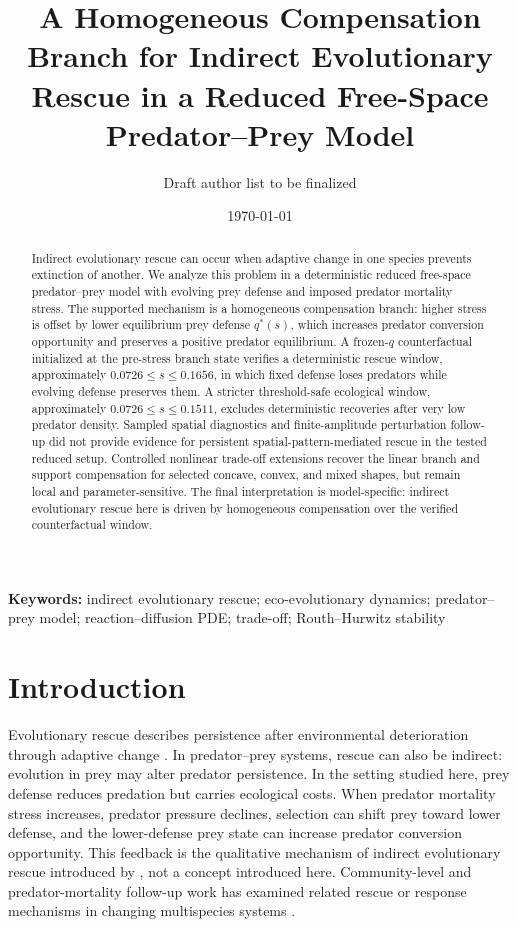 \documentclass[11pt]{article}
\title{A Homogeneous Compensation Branch for Indirect Evolutionary Rescue in a Reduced Free-Space Predator--Prey Model}
\author{Draft author list to be finalized}
\date{\today}
\begin{document}
\maketitle

\begin{abstract}
Indirect evolutionary rescue can occur when adaptive change in one species prevents extinction of another. We analyze this problem in a deterministic reduced free-space predator--prey model with evolving prey defense and imposed predator mortality stress. The supported mechanism is a homogeneous compensation branch: higher stress is offset by lower equilibrium prey defense \(q^*(s)\), which increases predator conversion opportunity and preserves a positive predator equilibrium. A frozen-\(q\) counterfactual initialized at the pre-stress branch state verifies a deterministic rescue window, approximately \(0.0726\le s\le0.1656\), in which fixed defense loses predators while evolving defense preserves them. A stricter threshold-safe ecological window, approximately \(0.0726\le s\le0.1511\), excludes deterministic recoveries after very low predator density. Sampled spatial diagnostics and finite-amplitude perturbation follow-up did not provide evidence for persistent spatial-pattern-mediated rescue in the tested reduced setup. Controlled nonlinear trade-off extensions recover the linear branch and support compensation for selected concave, convex, and mixed shapes, but remain local and parameter-sensitive. The final interpretation is model-specific: indirect evolutionary rescue here is driven by homogeneous compensation over the verified counterfactual window.
\end{abstract}

\begin{center}
\small\textbf{Keywords:} indirect evolutionary rescue; eco-evolutionary dynamics; predator--prey model; reaction--diffusion PDE; trade-off; Routh--Hurwitz stability
\end{center}

\section{Introduction}

Evolutionary rescue describes persistence after environmental deterioration through adaptive change \citep{GomulkiewiczHolt1995,BellGonzalez2009,Bell2017}. In predator--prey systems, rescue can also be indirect: evolution in prey may alter predator persistence. In the setting studied here, prey defense reduces predation but carries ecological costs. When predator mortality stress increases, predator pressure declines, selection can shift prey toward lower defense, and the lower-defense prey state can increase predator conversion opportunity. This feedback is the qualitative mechanism of indirect evolutionary rescue introduced by \citet{YamamichiMiner2015}, not a concept introduced here. Community-level and predator-mortality follow-up work has examined related rescue or response mechanisms in changing multispecies systems \citep{FussmannGonzalez2013,CortezYamamichi2019,HermannBecks2022}.
\end{document}
